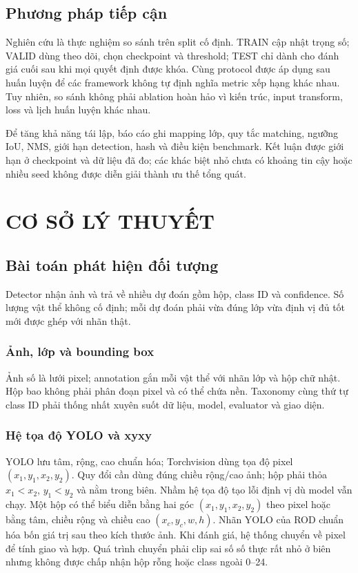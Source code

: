 \documentclass[12pt,a4paper,oneside]{report}
\begin{document}
\section{Phương pháp tiếp cận}
Nghiên cứu là thực nghiệm so sánh trên split cố định. TRAIN cập nhật trọng số; VALID dùng theo dõi, chọn checkpoint và threshold; TEST chỉ dành cho đánh giá cuối sau khi mọi quyết định được khóa. Cùng protocol được áp dụng sau huấn luyện để các framework không tự định nghĩa metric xếp hạng khác nhau. Tuy nhiên, so sánh không phải ablation hoàn hảo vì kiến trúc, input transform, loss và lịch huấn luyện khác nhau.

Để tăng khả năng tái lập, báo cáo ghi mapping lớp, quy tắc matching, ngưỡng IoU, NMS, giới hạn detection, hash và điều kiện benchmark. Kết luận được giới hạn ở checkpoint và dữ liệu đã đo; các khác biệt nhỏ chưa có khoảng tin cậy hoặc nhiều seed không được diễn giải thành ưu thế tổng quát.
\chapter{CƠ SỞ LÝ THUYẾT}\label{chap:theory}
\section{Bài toán phát hiện đối tượng}
Detector nhận ảnh và trả về nhiều dự đoán gồm hộp, class ID và confidence. Số lượng vật thể không cố định; mỗi dự đoán phải vừa đúng lớp vừa định vị đủ tốt mới được ghép với nhãn thật.
\subsection{Ảnh, lớp và bounding box}
Ảnh số là lưới pixel; annotation gắn mỗi vật thể với nhãn lớp và hộp chữ nhật. Hộp bao không phải phân đoạn pixel và có thể chứa nền. Taxonomy cùng thứ tự class ID phải thống nhất xuyên suốt dữ liệu, model, evaluator và giao diện.
\subsection{Hệ tọa độ YOLO và xyxy}
YOLO lưu tâm, rộng, cao chuẩn hóa; Torchvision dùng tọa độ pixel $(x_1,y_1,x_2,y_2)$. Quy đổi cần dùng đúng chiều rộng/cao ảnh; hộp phải thỏa $x_1<x_2$, $y_1<y_2$ và nằm trong biên. Nhầm hệ tọa độ tạo lỗi định vị dù model vẫn chạy.
Một hộp có thể biểu diễn bằng hai góc $(x_1,y_1,x_2,y_2)$ theo pixel hoặc bằng tâm, chiều rộng và chiều cao $(x_c,y_c,w,h)$. Nhãn YOLO của ROD chuẩn hóa bốn giá trị sau theo kích thước ảnh. Khi đánh giá, hệ thống chuyển về pixel để tính giao và hợp. Quá trình chuyển phải clip sai số số thực rất nhỏ ở biên nhưng không được chấp nhận hộp rỗng hoặc class ngoài 0--24.
\end{document}

